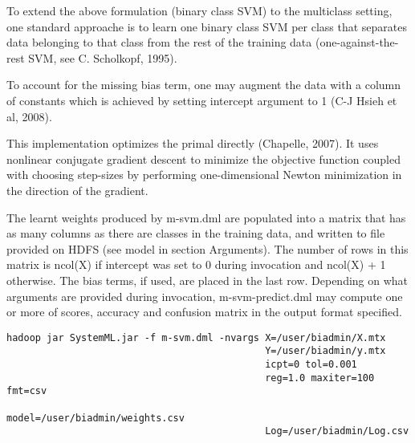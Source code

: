 To extend the above formulation (binary class SVM) to the multiclass setting,
one standard approache is to learn one binary class SVM per class that 
separates data belonging to that class from the rest of the training data 
(one-against-the-rest SVM, see C. Scholkopf, 1995).

To account for the missing bias term, one may augment the data with a column
of constants which is achieved by setting intercept argument to 1 (C-J Hsieh 
et al, 2008).

This implementation optimizes the primal directly (Chapelle, 2007). It uses 
nonlinear conjugate gradient descent to minimize the objective function 
coupled with choosing step-sizes by performing one-dimensional Newton 
minimization in the direction of the gradient.
\\


The learnt weights produced by m-svm.dml are populated into a matrix that 
has as many columns as there are classes in the training data, and written 
to file provided on HDFS (see model in section Arguments). The number of rows
in this matrix is ncol(X) if intercept was set to 0 during invocation and ncol(X) + 1
otherwise. The bias terms, if used, are placed in the last row. Depending on what
arguments are provided during invocation, m-svm-predict.dml may compute one or more
of scores, accuracy and confusion matrix in the output format specified.
\\

\begin{verbatim}
hadoop jar SystemML.jar -f m-svm.dml -nvargs X=/user/biadmin/X.mtx 
                                             Y=/user/biadmin/y.mtx 
                                             icpt=0 tol=0.001
                                             reg=1.0 maxiter=100 fmt=csv 
                                             model=/user/biadmin/weights.csv
                                             Log=/user/biadmin/Log.csv
\end{verbatim}

